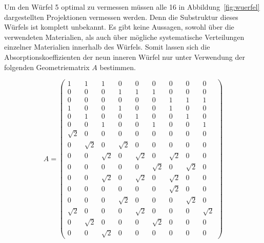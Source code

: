 Um den Würfel 5 optimal zu vermessen müssen alle 16 in Abbildung~\ref{fig:wuerfel} dargestellten Projektionen
vermessen werden. Denn die Substruktur dieses Würfels ist komplett unbekannt. Es gibt keine Aussagen, sowohl über
die verwendeten Materialien, als auch über mögliche systematische Verteilungen einzelner Materialien innerhalb des Würfels.
Somit lassen sich die Absorptionskoeffizienten der neun inneren Würfel nur unter Verwendung der folgenden Geometriematrix $A$ bestimmen.

\begin{equation}
	A=
	\begin{pmatrix}
    1 & 1 & 1 & 0 & 0 & 0 & 0 & 0 & 0 \\
    0 & 0 & 0 & 1 & 1 & 1 & 0 & 0 & 0 \\
    0 & 0 & 0 & 0 & 0 & 0 & 1 & 1 & 1 \\
    1 & 0 & 0 & 1 & 0 & 0 & 1 & 0 & 0 \\
    0 & 1 & 0 & 0 & 1 & 0 & 0 & 1 & 0 \\
    0 & 0 & 1 & 0 & 0 & 1 & 0 & 0 & 1 \\
    \sqrt{2} & 0 & 0 & 0 & 0 & 0 & 0 & 0 & 0 \\
    0 & \sqrt{2} & 0 & \sqrt{2} & 0 & 0 & 0 & 0 & 0 \\
    0 & 0 & \sqrt{2} & 0 & \sqrt{2} & 0 & \sqrt{2} & 0 & 0 \\
    0 & 0 & 0 & 0 & 0 & \sqrt{2} & 0 & \sqrt{2} & 0 \\
    0 & 0 & \sqrt{2} & 0 & \sqrt{2} & 0 & \sqrt{2} & 0 & 0 \\
    0 & 0 & 0 & 0 & 0 & 0 & \sqrt{2} & 0 & 0 \\
    0 & 0 & 0 & \sqrt{2} & 0 & 0 & 0 & \sqrt{2} & 0 \\
    \sqrt{2} & 0 & 0 & 0 & \sqrt{2} & 0 & 0 & 0 & \sqrt{2} \\
    0 & \sqrt{2} & 0 & 0 & 0 & \sqrt{2} & 0 & 0 & 0 \\
    0 & 0 & \sqrt{2} & 0 & 0 & 0 & 0 & 0 & 0
	\end{pmatrix}
\end{equation}

